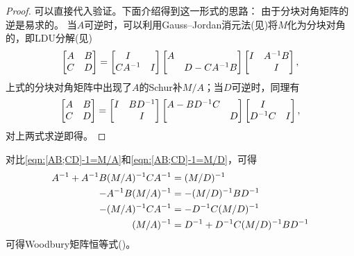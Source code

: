 \begin{proof}
	可以直接代入验证。下面介绍得到这一形式的思路：
	由于分块对角矩阵的逆是易求的。
	当$A$可逆时，可以利用Gauss--Jordan消元法(见)将$M$化为分块对角的，即LDU分解(见)
	\begin{equation}\label{eq:la-schur-factorization-a}
		\begin{bmatrix}
			A&B\\C&D
		\end{bmatrix} = \begin{bmatrix}
			I\\CA^{-1}&I
		\end{bmatrix}\begin{bmatrix}
			A\\ &D - CA^{-1} B
		\end{bmatrix}\begin{bmatrix}
			I&A^{-1} B\\ &I
		\end{bmatrix},
	\end{equation}
	上式的分块对角矩阵中出现了$A$的Schur补$M/A$；当$D$可逆时，同理有
	\begin{equation}\label{eq:la-schur-factorization-d}
		\begin{bmatrix}
			A&B\\C&D
		\end{bmatrix} = \begin{bmatrix}
			I&BD^{-1}\\ &I
		\end{bmatrix}\begin{bmatrix}
			A - BD^{-1} C\\ &D
		\end{bmatrix}\begin{bmatrix}
			I\\D^{-1} C&I
		\end{bmatrix},
	\end{equation}
	对上两式求逆即得。
\end{proof}

\begin{corollary}
	对比\eqref{eqn:[AB;CD]-1=M/A}和\eqref{eqn:[AB;CD]-1=M/D}，可得
	\begin{subequations}
		\begin{align}
			A^{-1} + A^{-1} B(M/A)^{-1} CA^{-1} &= (M/D)^{-1}\\
			-A^{-1} B(M/A)^{-1} &= -(M/D)^{-1} BD^{-1}\\
			-(M/A)^{-1} CA^{-1} &= -D^{-1} C(M/D)^{-1}\\
			(M/A)^{-1} &= D^{-1} + D^{-1} C(M/D)^{-1} BD^{-1}
		\end{align}
	\end{subequations}
	可得Woodbury矩阵恒等式()。
\end{corollary}

